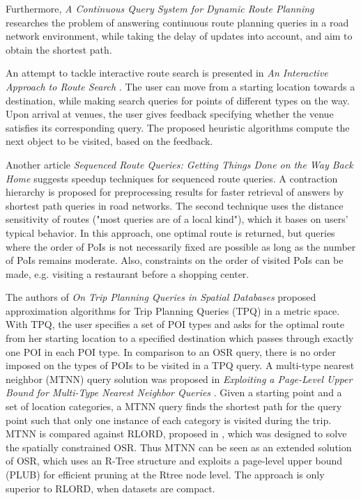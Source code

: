 Furthermore, \textit{A Continuous Query System for Dynamic Route Planning} \cite{dynamic} researches the problem of answering continuous route planning queries in a road network environment, while taking the delay of updates into account, and aim to obtain the shortest path.

An attempt to tackle interactive route search is presented in \textit{An Interactive Approach to Route Search} \cite{interactive}. The user can move from a starting location towards a destination, while making search queries for points of different types on the way. Upon arrival at venues, the user gives feedback specifying whether the venue satisfies its corresponding query. The proposed heuristic algorithms compute the next object to be visited, based on the feedback.

Another article \textit{Sequenced Route Queries: Getting Things Done on the Way Back Home} \cite{skyline} suggests speedup techniques for sequenced route queries. A contraction hierarchy is proposed for preprocessing results for faster retrieval of answers by shortest path queries in road networks. The second technique uses the distance sensitivity of routes ("most queries are of a local kind"), which it bases on users' typical behavior. In this approach, one optimal route is returned, but queries where the order of PoIs is not necessarily fixed are possible as long as the number of PoIs remains moderate. Also, constraints on the order of visited PoIs can be made, e.g. visiting a restaurant before a shopping center. 

The authors of \textit{On Trip Planning Queries in Spatial Databases} \cite{tpq} proposed approximation algorithms for Trip Planning Queries (TPQ) in a metric space. With TPQ, the user specifies a set of POI types and asks for the optimal route from her starting location to a specified destination which passes through exactly one POI in each POI type. In comparison to an OSR query, there is no order imposed on the types of POIs to be visited in a TPQ query. A multi-type nearest neighbor (MTNN) query solution was proposed in \textit{Exploiting a Page-Level Upper Bound for Multi-Type Nearest Neighbor Queries} \cite{mtnn}. Given a starting point and a set of location categories, a MTNN query finds the shortest path for the query point such that only one instance of each category is visited during the trip. MTNN is compared against RLORD, proposed in \cite{OSR}, which was designed to solve the spatially constrained OSR. Thus MTNN can be seen as an extended solution of OSR, which uses an R-Tree structure and exploits a page-level upper bound (PLUB) for efficient pruning at the Rtree node level. The approach is only superior to RLORD, when datasets are compact.


